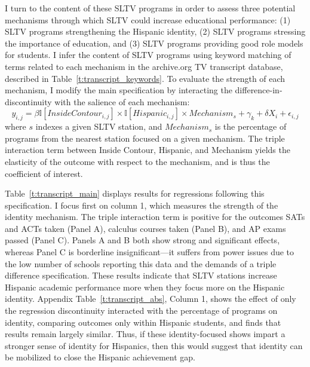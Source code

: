 \documentclass[11pt]{article}
\begin{document}
I turn to the content of these SLTV programs in order to assess three potential mechanisms through which SLTV could increase educational performance: (1) SLTV programs strengthening the Hispanic identity, (2) SLTV programs stressing the importance of education, and (3) SLTV programs providing good role models for students. I infer the content of SLTV programs using keyword matching of terms related to each mechanism in the archive.org TV transcript database, described in Table~\ref{t:transcript_keywords}. To evaluate the strength of each mechanism, I modify the main specification by interacting the difference-in-discontinuity with the salience of each mechanism:
\[ y_{i,j} =  \beta \mathbb{I}[InsideContour_{i,j}] \times \mathbb{I}[Hispanic_{i,j}] \times Mechanism_{s} + \gamma_k + \delta  X_i + \epsilon_{i,j}\] 
where $s$ indexes a given SLTV station, and $Mechanism_s$ is the percentage of programs from the nearest station focused on a given mechanism. The triple interaction term between Inside Contour, Hispanic, and Mechanism yields the elasticity of the outcome with respect to the mechanism, and is thus the coefficient of interest.

Table~\ref{t:transcript_main} displays results for regressions following this specification. I focus first on column 1, which measures the strength of the identity mechanism. The triple interaction term is positive for the outcomes SATs and ACTs taken (Panel A), calculus courses taken (Panel B), and AP exams passed (Panel C). Panels A and B both show strong and significant effects, whereas Panel C is borderline insignificant---it suffers from power issues due to the low number of schools reporting this data and the demands of a triple difference specification. These results indicate that SLTV stations increase Hispanic academic performance more when they focus more on the Hispanic identity. Appendix Table~\ref{t:transcript_abs}, Column 1, shows the effect of only the regression discontinuity interacted with the percentage of programs on identity, comparing outcomes only within Hispanic students, and finds that results remain largely similar. Thus, if these identity-focused shows impart a stronger sense of identity for Hispanics, then this would suggest that identity can be mobilized to close the Hispanic achievement gap.
\end{document}
